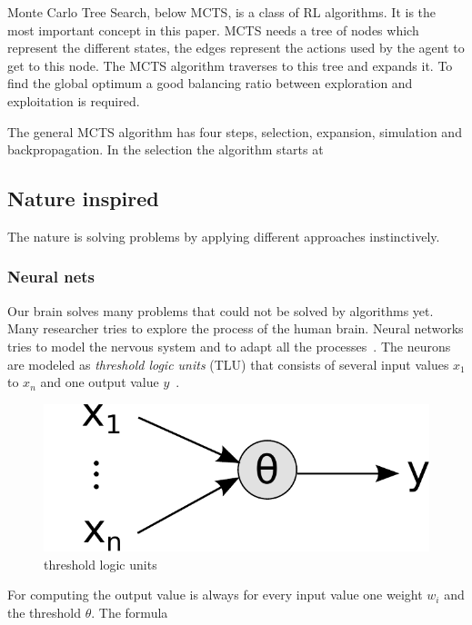 Monte Carlo Tree Search, below MCTS, is a class of RL algorithms. It is the most important concept in this paper. MCTS needs a tree of nodes which represent the different states, the edges represent the actions used by the agent to get to this node. The MCTS algorithm traverses to this tree and expands it. To find the global optimum a good balancing ratio between exploration and exploitation is required. 



The general MCTS algorithm has four steps, selection, expansion, simulation and backpropagation. In the selection the algorithm starts at  


\subsection{Nature inspired} 
The nature is solving problems by applying different approaches instinctively. 

\subsubsection{Neural nets} 
Our brain solves many problems that could not be solved by algorithms yet. Many researcher tries to explore the process of the human brain. Neural networks tries to model the nervous system and to adapt all the processes~\cite{nn_intro}. The neurons are modeled as \textit{threshold logic units} (TLU) that consists of several input values $x_1$ to $x_n$ and one output value $y$~\cite{ci_kruse}. 


\begin{figure}
\centering
\includegraphics[scale=0.5]{images/tlu.pdf}
\caption{threshold logic units ~\cite{ci_kruse}}
\label{fig:tlu}
\end{figure}


For computing the output value is always for every input value one weight $w_i$ and the threshold $\theta$. The formula 

